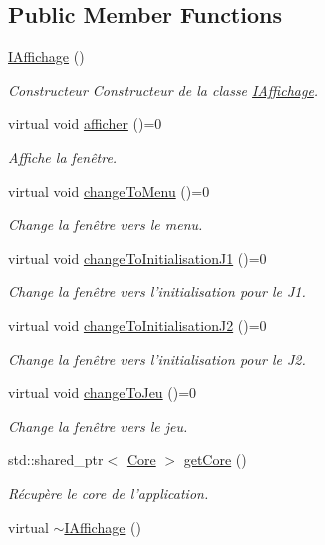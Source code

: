 \subsection*{Public Member Functions}
\begin{DoxyCompactItemize}
\item 
\hypertarget{classIAffichage_a0bc54bcf0afae03db411636834b372fe}{\hyperlink{classIAffichage_a0bc54bcf0afae03db411636834b372fe}{I\+Affichage} ()}\label{classIAffichage_a0bc54bcf0afae03db411636834b372fe}

\begin{DoxyCompactList}\small\item\em Constructeur Constructeur de la classe \hyperlink{classIAffichage}{I\+Affichage}. \end{DoxyCompactList}\item 
virtual void \hyperlink{classIAffichage_a87e168995340186305675343d4b769fe}{afficher} ()=0
\begin{DoxyCompactList}\small\item\em Affiche la fenêtre. \end{DoxyCompactList}\item 
virtual void \hyperlink{classIAffichage_a147a42f3068b7dc51d5a196252e53a39}{change\+To\+Menu} ()=0
\begin{DoxyCompactList}\small\item\em Change la fenêtre vers le menu. \end{DoxyCompactList}\item 
virtual void \hyperlink{classIAffichage_ac03c56ab489b760b1e42af15ac421039}{change\+To\+Initialisation\+J1} ()=0
\begin{DoxyCompactList}\small\item\em Change la fenêtre vers l'initialisation pour le J1. \end{DoxyCompactList}\item 
virtual void \hyperlink{classIAffichage_a425bcafe36ba332f2cbc4badc99e19c2}{change\+To\+Initialisation\+J2} ()=0
\begin{DoxyCompactList}\small\item\em Change la fenêtre vers l'initialisation pour le J2. \end{DoxyCompactList}\item 
virtual void \hyperlink{classIAffichage_a52e20907ed94e272c592429d95fa5165}{change\+To\+Jeu} ()=0
\begin{DoxyCompactList}\small\item\em Change la fenêtre vers le jeu. \end{DoxyCompactList}\item 
std\+::shared\+\_\+ptr$<$ \hyperlink{classCore}{Core} $>$ \hyperlink{classIAffichage_a7245173f805ffb6a17b4fbda887bcfd6}{get\+Core} ()
\begin{DoxyCompactList}\small\item\em Récupère le core de l'application. \end{DoxyCompactList}\item 
\hypertarget{classIAffichage_a2b22d88915d1a8951ba3cd027bbaed0f}{virtual \hyperlink{classIAffichage_a2b22d88915d1a8951ba3cd027bbaed0f}{$\sim$\+I\+Affichage} ()}\label{classIAffichage_a2b22d88915d1a8951ba3cd027bbaed0f}


\end{DoxyCompactItemize}
